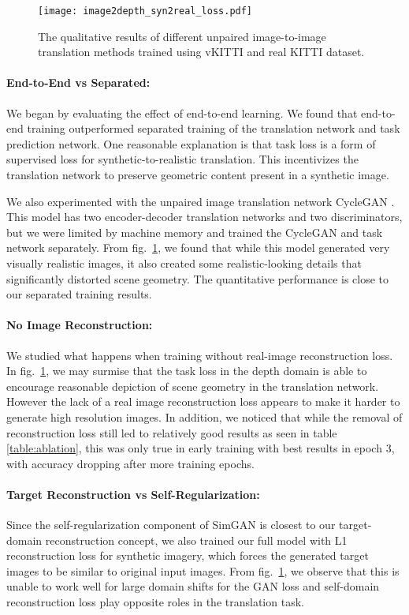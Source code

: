 \documentclass[runningheads]{llncs}
\begin{document}
\begin{figure}[tb!]
	\centering
	\texttt{[image: image2depth\_syn2real\_loss.pdf]}
	\caption{The qualitative results of different unpaired image-to-image translation methods trained using vKITTI and real KITTI dataset. }
	\label{fig:syn2real_ablation}
\end{figure}

\paragraph{\bf End-to-End vs Separated:} We began by evaluating the effect of end-to-end learning. We found that end-to-end training outperformed separated training of the translation network and task prediction network. One reasonable explanation is that task loss is a form of supervised loss for synthetic-to-realistic translation. This incentivizes the translation network to preserve geometric content present in a synthetic image.

We also experimented with the unpaired image translation network CycleGAN \cite{zhu2017unpaired}. This model has two encoder-decoder translation networks and two discriminators, but we were limited by machine memory and trained the CycleGAN and task network separately. From fig.~\ref{fig:syn2real_ablation}, we found that while this model generated very visually realistic images, it also created some realistic-looking details that significantly distorted scene geometry. The quantitative performance is close to our separated training results.

\paragraph{\bf No Image Reconstruction:} We studied what happens when training without real-image reconstruction loss. In fig.~\ref{fig:syn2real_ablation}, we may surmise that the task loss in the depth domain is able to encourage reasonable depiction of scene geometry in the translation network. However the lack of a real image reconstruction loss appears to make it harder to generate high resolution images. In addition, we noticed that while the removal of reconstruction loss still led to relatively good results as seen in table \ref{table:ablation}, this was only true in early training with best results in epoch 3, with accuracy dropping after more training epochs.

\paragraph{\bf Target Reconstruction vs Self-Regularization:} Since the self-regularization component of SimGAN is closest to our target-domain reconstruction concept, we also trained our full model with L1 reconstruction loss for synthetic imagery, which forces the generated target images to be similar to original input images. From fig.~\ref{fig:syn2real_ablation}, we observe that this is unable to work well for large domain shifts for the GAN loss and self-domain reconstruction loss play opposite roles in the translation task.  
\end{document}
